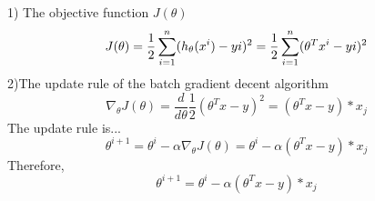 \begin{answer}
1) The objective function $J(\theta)$
\begin{equation*}
    J(\theta) = \frac{1}{2}\sum_{i=1}^{n} (h_\theta(x^{i}) -y{i})^{2} =   \frac{1}{2}\sum_{i=1}^{n} (\theta^{T}x^{i} -y{i})^{2}
    \end{equation*}
2)The update rule of the batch gradient decent algorithm
\begin{equation*}
    \nabla_\theta J(\theta) = \frac{d}{d\theta}\frac{1}{2}(\theta^{T}x-y)^{2} = (\theta^{T}x-y)*x_j
\end{equation*}
The update rule is...
\begin{equation*}
    \theta^{i+1} = \theta^{i} - \alpha \nabla_\theta J(\theta) = \theta^{i} - \alpha (\theta^{T}x-y)*x_j
\end{equation*}
Therefore,
\begin{equation*}
    \theta^{i+1} = \theta^{i} - \alpha (\theta^{T}x-y)*x_j 
\end{equation*}
\end{answer}

